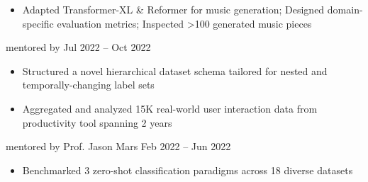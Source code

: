 {\begin{itemize}
        \item Adapted Transformer-XL \& Reformer for music generation; Designed domain-specific evaluation metrics; Inspected >100 generated music pieces
    \end{itemize}
    \dividerSmall




        {{\bodyfontsize \color{body} mentored by} }
        {Jul 2022 -- Oct 2022}
        {}{}
    \begin{itemize}
        \item Structured a novel hierarchical dataset schema tailored for nested and temporally-changing label sets

        \item Aggregated and analyzed 15K real-world user interaction data from  productivity tool spanning 2 years

    \end{itemize}
    \dividerSmall


        {{\bodyfontsize \color{body} mentored by} Prof. Jason Mars}
        {Feb 2022 -- Jun 2022}
        {}{}
    \begin{itemize}

        \item Benchmarked 3 zero-shot classification paradigms across 18 diverse datasets


\end{itemize}}
